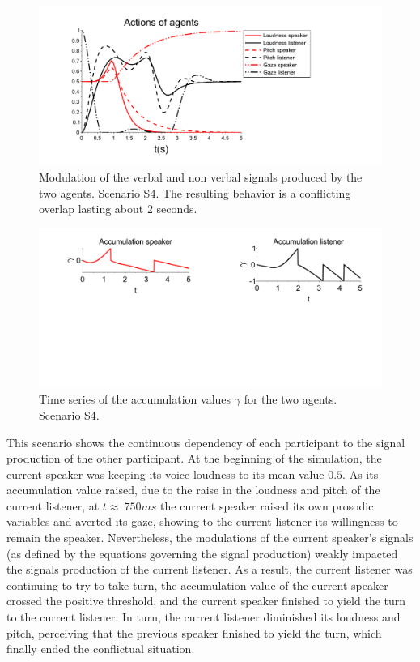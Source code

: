\begin{figure}
  \centering
  \includegraphics[width=\linewidth]{figure/emerg_sc1.pdf}
  \caption{Modulation of the verbal and non verbal signals produced by the two agents. Scenario S4. The resulting behavior is a conflicting overlap lasting about 2 seconds.}
  \label{simu_interruption}
\end{figure}

\begin{figure}
  \centering
  \includegraphics[width=\linewidth]{figure/acc_sc1.pdf}
  \caption{Time series of the accumulation values $\gamma$ for the two agents. Scenario S4.}
  \label{inter_acc}
\end{figure}

This scenario shows the continuous dependency of each participant to the signal production of the other participant. At the beginning of the simulation, the current speaker was keeping its voice loudness to its mean value $0.5$. As its accumulation value raised, due to the raise in the loudness and pitch of the current listener, at $t\approx~750ms$ the current speaker raised its own prosodic variables and averted its gaze, showing to the current listener its willingness to remain the speaker. Nevertheless, the modulations of the current speaker's signals (as defined by the equations governing the signal production) weakly impacted the signals production of the current listener. As a result, the current listener was continuing to try to take turn, the accumulation value of the current speaker crossed the positive threshold, and the current speaker finished to yield the turn to the current listener. In turn, the current listener diminished its loudness and pitch, perceiving that the previous speaker finished to yield the turn, which finally ended the conflictual situation.


